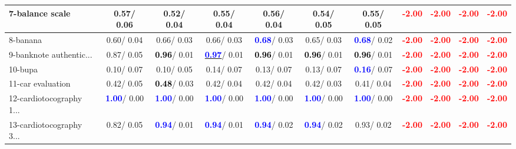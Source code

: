 \begin{table}[h]
\begin{center}
{\begin{tabular}{lc|c|c|c|c|c|c|c|c|c}
7-balance scale &   0.57/  0.06 &   0.52/  0.04 &   0.55/  0.04 &   0.56/  0.04 &   0.54/  0.05 &   0.55/  0.05 & \textcolor{red}{\textbf{ -2.00}} & \textcolor{red}{\textbf{ -2.00}} & \textcolor{red}{\textbf{ -2.00}} & \textcolor{red}{\textbf{ -2.00}} \\ \hline
8-banana &   0.60/  0.04 &   0.66/  0.03 &   0.66/  0.03 & \textcolor{blue}{\textbf{  0.68}}/  0.03 &   0.65/  0.03 & \textcolor{blue}{\textbf{  0.68}}/  0.02 & \textcolor{red}{\textbf{ -2.00}} & \textcolor{red}{\textbf{ -2.00}} & \textcolor{red}{\textbf{ -2.00}} & \textcolor{red}{\textbf{ -2.00}} \\
9-banknote authentic... &   0.87/  0.05 & \textcolor{black}{\textbf{  0.96}}/  0.01 & \underline{\textcolor{blue}{\textbf{  0.97}}}/  0.01 & \textcolor{black}{\textbf{  0.96}}/  0.01 & \textcolor{black}{\textbf{  0.96}}/  0.01 & \textcolor{black}{\textbf{  0.96}}/  0.01 & \textcolor{red}{\textbf{ -2.00}} & \textcolor{red}{\textbf{ -2.00}} & \textcolor{red}{\textbf{ -2.00}} & \textcolor{red}{\textbf{ -2.00}} \\
10-bupa &   0.10/  0.07 &   0.10/  0.05 &   0.14/  0.07 &   0.13/  0.07 &   0.13/  0.07 & \textcolor{blue}{\textbf{  0.16}}/  0.07 & \textcolor{red}{\textbf{ -2.00}} & \textcolor{red}{\textbf{ -2.00}} & \textcolor{red}{\textbf{ -2.00}} & \textcolor{red}{\textbf{ -2.00}} \\
11-car evaluation &   0.42/  0.05 & \textcolor{black}{\textbf{  0.48}}/  0.03 &   0.42/  0.04 &   0.42/  0.04 &   0.42/  0.03 &   0.41/  0.04 & \textcolor{red}{\textbf{ -2.00}} & \textcolor{red}{\textbf{ -2.00}} & \textcolor{red}{\textbf{ -2.00}} & \textcolor{red}{\textbf{ -2.00}} \\
12-cardiotocography 1... & \textcolor{blue}{\textbf{  1.00}}/  0.00 & \textcolor{blue}{\textbf{  1.00}}/  0.00 & \textcolor{blue}{\textbf{  1.00}}/  0.00 & \textcolor{blue}{\textbf{  1.00}}/  0.00 & \textcolor{blue}{\textbf{  1.00}}/  0.00 & \textcolor{blue}{\textbf{  1.00}}/  0.00 & \textcolor{red}{\textbf{ -2.00}} & \textcolor{red}{\textbf{ -2.00}} & \textcolor{red}{\textbf{ -2.00}} & \textcolor{red}{\textbf{ -2.00}} \\
13-cardiotocography 3... &   0.82/  0.05 & \textcolor{blue}{\textbf{  0.94}}/  0.01 & \textcolor{blue}{\textbf{  0.94}}/  0.01 & \textcolor{blue}{\textbf{  0.94}}/  0.02 & \textcolor{blue}{\textbf{  0.94}}/  0.02 &   0.93/  0.02 & \textcolor{red}{\textbf{ -2.00}} & \textcolor{red}{\textbf{ -2.00}} & \textcolor{red}{\textbf{ -2.00}} & \textcolor{red}{\textbf{ -2.00}} \\

\end{tabular}}
\end{center}
\end{table}
